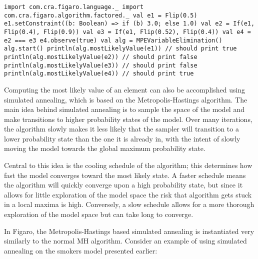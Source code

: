 \begin{flushleft}
\texttt{import com.cra.figaro.language.\_
\newline import com.cra.figaro.algorithm.factored.\_
\newline 
\newline val e1 = Flip(0.5)
\newline e1.setConstraint((b: Boolean) => if (b) 3.0; else 1.0)
\newline val e2 = If(e1, Flip(0.4), Flip(0.9)) 
\newline val e3 = If(e1, Flip(0.52), Flip(0.4)) 
\newline val e4 = e2 === e3
\newline e4.observe(true)
\newline 
\newline val alg = MPEVariableElimination()
\newline alg.start()
\newline println(alg.mostLikelyValue(e1)) // should print true 
\newline println(alg.mostLikelyValue(e2)) // should print false 
\newline println(alg.mostLikelyValue(e3)) // should print false 
\newline println(alg.mostLikelyValue(e4)) // should print true
}
\end{flushleft}

Computing the most likely value of an element can also be accomplished using simulated annealing, which is based on the Metropolis-Hastings algorithm. The main idea behind simulated annealing is to sample the space of the model and make transitions to higher probability states of the model. Over many iterations, the algorithm slowly makes it less likely that the sampler will transition to a lower probability state than the one it is already in, with the intent of slowly moving the model towards the global maximum probability state.

Central to this idea is the cooling schedule of the algorithm; this determines how fast the model converges toward the most likely state. A faster schedule means the algorithm will quickly converge upon a high probability state, but since it allows for little exploration of the model space the risk that algorithm gets stuck in a local maxima is high. Conversely, a slow schedule allows for a more thorough exploration of the model space but can take long to converge.

In Figaro, the Metropolis-Hastings based simulated annealing is instantiated very similarly to the normal MH algorithm. Consider an example of using simulated annealing on the smokers model presented earlier:


